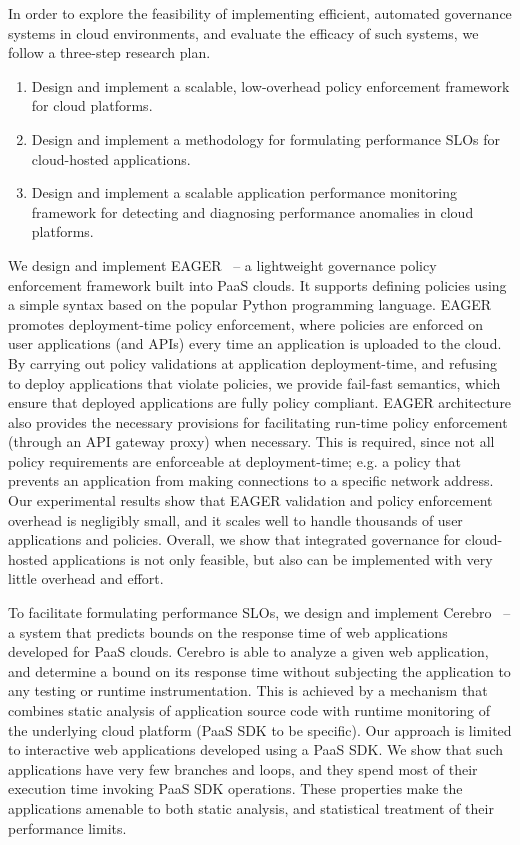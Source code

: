 In order to explore the feasibility of implementing efficient, automated governance systems in 
cloud environments, and evaluate the efficacy of such systems, we follow a three-step
research plan.
\begin{enumerate}
\item Design and implement a scalable, low-overhead policy enforcement framework for cloud platforms.
\item Design and implement a methodology for formulating performance SLOs for cloud-hosted applications.
 \item Design and implement a scalable application performance monitoring framework for 
 detecting and diagnosing performance anomalies in cloud platforms.
\end{enumerate}

We design and implement EAGER~\cite{6903538, eager-fop15} -- a lightweight governance policy
enforcement framework built into PaaS clouds. It supports defining policies using a simple syntax
based on the popular Python programming language. EAGER promotes deployment-time
policy enforcement, where policies are enforced on user applications (and APIs) every time
an application is uploaded to the cloud. By carrying out policy validations at
application deployment-time, and refusing to deploy applications that violate policies,
 we provide fail-fast semantics, which ensure that deployed applications are fully policy compliant. 
EAGER architecture also provides the necessary provisions for facilitating run-time policy
enforcement (through an API gateway proxy) when necessary. This is required, since not all
policy requirements are enforceable at deployment-time; e.g. a policy that prevents an
application from making connections to a specific network address. Our experimental results show
that EAGER validation and policy enforcement overhead is negligibly small, and it scales well to
handle thousands of user applications and policies. Overall, we show that integrated governance
for cloud-hosted applications is not only feasible, but also can be implemented with very
little overhead and effort.

To facilitate formulating performance SLOs, we design and implement 
Cerebro~\cite{Jayathilaka:2015:RTS:2806777.2806842} --
a system that predicts bounds on the response time of web applications developed for PaaS clouds.
Cerebro is able to analyze a given web application, and determine a bound on its response time without
subjecting the application to any testing or runtime instrumentation. This is achieved by a mechanism
that combines static analysis of application source code with runtime monitoring of the underlying
cloud platform (PaaS SDK to be specific). Our approach is limited to interactive web applications
developed using a PaaS SDK. We show that such applications have very few branches and loops, 
and they spend most of their execution time invoking PaaS SDK operations. These properties
make the applications amenable to both static analysis, and statistical treatment of their 
performance limits.

